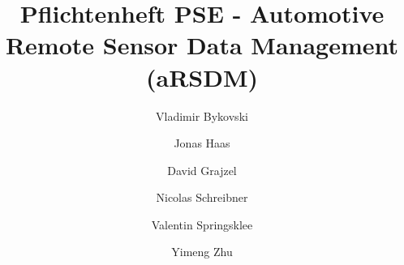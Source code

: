 \documentclass[a4paper]{scrreprt}
\begin{document}
\title{Pflichtenheft PSE - Automotive Remote Sensor Data Management (aRSDM)}
\author{Vladimir Bykovski 
			\and Jonas Haas 
			\and David Grajzel 
			\and Nicolas Schreibner
			\and Valentin Springsklee
			\and Yimeng Zhu}

\maketitle

\newpage

\setcounter{page}{1} %


\tableofcontents

\newpage
{}














\end{document}
